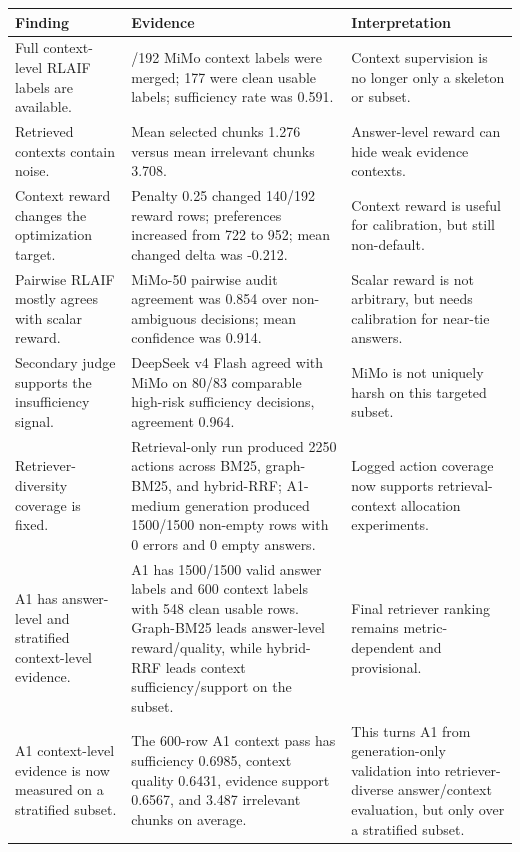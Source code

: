 \begin{center}
\small
\begin{tabular}{>{\raggedright\arraybackslash}p{4.0cm} >{\raggedright\arraybackslash}p{7.0cm} >{\raggedright\arraybackslash}p{3.1cm}}
\toprule
Finding & Evidence & Interpretation \\
\midrule
Full context-level RLAIF labels are available. & 192/192 MiMo context labels were merged; 177 were clean usable labels; sufficiency rate was 0.591. & Context supervision is no longer only a skeleton or subset. \\
Retrieved contexts contain noise. & Mean selected chunks 1.276 versus mean irrelevant chunks 3.708. & Answer-level reward can hide weak evidence contexts. \\
Context reward changes the optimization target. & Penalty 0.25 changed 140/192 reward rows; preferences increased from 722 to 952; mean changed delta was -0.212. & Context reward is useful for calibration, but still non-default. \\
Pairwise RLAIF mostly agrees with scalar reward. & MiMo-50 pairwise audit agreement was 0.854 over non-ambiguous decisions; mean confidence was 0.914. & Scalar reward is not arbitrary, but needs calibration for near-tie answers. \\
Secondary judge supports the insufficiency signal. & DeepSeek v4 Flash agreed with MiMo on 80/83 comparable high-risk sufficiency decisions, agreement 0.964. & MiMo is not uniquely harsh on this targeted subset. \\
Retriever-diversity coverage is fixed. & Retrieval-only run produced 2250 actions across BM25, graph-BM25, and hybrid-RRF; A1-medium generation produced 1500/1500 non-empty rows with 0 errors and 0 empty answers. & Logged action coverage now supports retrieval-context allocation experiments. \\
A1 has answer-level and stratified context-level evidence. & A1 has 1500/1500 valid answer labels and 600 context labels with 548 clean usable rows. Graph-BM25 leads answer-level reward/quality, while hybrid-RRF leads context sufficiency/support on the subset. & Final retriever ranking remains metric-dependent and provisional. \\
A1 context-level evidence is now measured on a stratified subset. & The 600-row A1 context pass has sufficiency 0.6985, context quality 0.6431, evidence support 0.6567, and 3.487 irrelevant chunks on average. & This turns A1 from generation-only validation into retriever-diverse answer/context evaluation, but only over a stratified subset. \\

\end{tabular}
\end{center}
